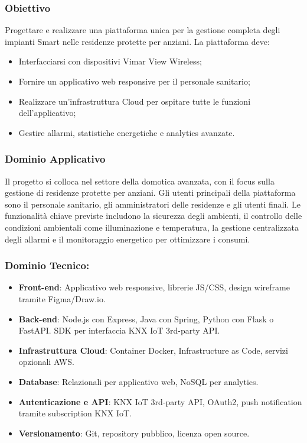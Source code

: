 \documentclass[a4paper,12pt]{article}
\begin{document}
\subsubsection*{Obiettivo}
Progettare e realizzare una piattaforma unica per la gestione completa degli impianti Smart nelle residenze protette per anziani. La piattaforma deve:
\begin{itemize}
    \item Interfacciarsi con dispositivi Vimar View Wireless;
    \item Fornire un applicativo web responsive per il personale sanitario;
    \item Realizzare un’infrastruttura Cloud per ospitare tutte le funzioni dell’applicativo;
    \item Gestire allarmi, statistiche energetiche e analytics avanzate.
\end{itemize}

\subsubsection*{Dominio Applicativo}
Il progetto si colloca nel settore della domotica avanzata, con il focus sulla gestione di residenze protette per anziani. Gli utenti principali della piattaforma sono il personale sanitario, gli amministratori delle residenze e gli utenti finali. Le funzionalità chiave previste includono la sicurezza degli ambienti, il controllo delle condizioni ambientali come illuminazione e temperatura, la gestione centralizzata degli allarmi e il monitoraggio energetico per ottimizzare i consumi.


\subsubsection*{Dominio Tecnico:}
\begin{itemize}
    \item \textbf{Front-end}: Applicativo web responsive, librerie JS/CSS, design wireframe tramite Figma/Draw.io.
    \item \textbf{Back-end}: Node.js con Express, Java con Spring, Python con Flask o FastAPI. SDK per interfaccia KNX IoT 3rd-party API.
    \item \textbf{Infrastruttura Cloud}: Container Docker, Infrastructure as Code, servizi opzionali AWS.
    \item \textbf{Database}: Relazionali per applicativo web, NoSQL per analytics.
    \item \textbf{Autenticazione e API}: KNX IoT 3rd-party API, OAuth2, push notification tramite subscription KNX IoT.
    \item \textbf{Versionamento}: Git, repository pubblico, licenza open source.
\end{itemize}
\end{document}
